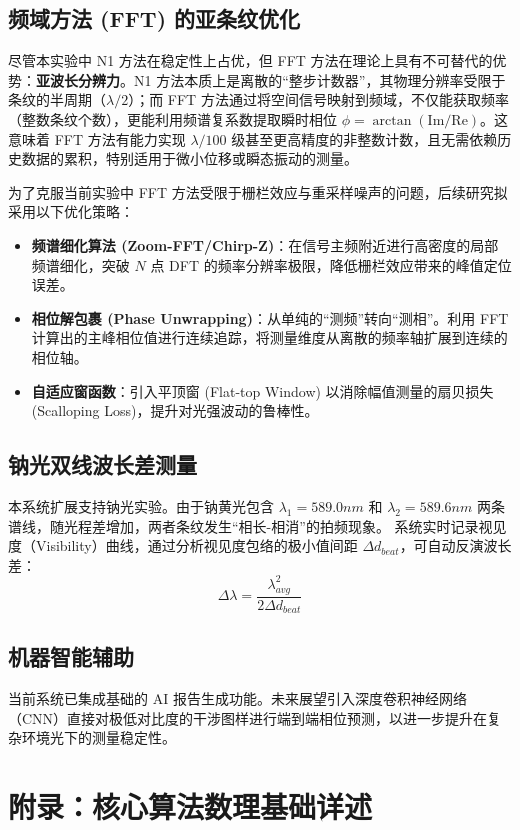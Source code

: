 \documentclass[twocolumn, a4paper, 10pt]{article}
\begin{document}
\subsection{频域方法 (FFT) 的亚条纹优化}
尽管本实验中 N1 方法在稳定性上占优，但 FFT 方法在理论上具有不可替代的优势：\textbf{亚波长分辨力}。N1 方法本质上是离散的“整步计数器”，其物理分辨率受限于条纹的半周期（$\lambda/2$）；而 FFT 方法通过将空间信号映射到频域，不仅能获取频率（整数条纹个数），更能利用频谱复系数提取瞬时相位 $\phi = \arctan(\text{Im}/\text{Re})$。这意味着 FFT 方法有能力实现 $\lambda/100$ 级甚至更高精度的非整数计数，且无需依赖历史数据的累积，特别适用于微小位移或瞬态振动的测量。

为了克服当前实验中 FFT 方法受限于栅栏效应与重采样噪声的问题，后续研究拟采用以下优化策略：
\begin{itemize}
    \item \textbf{频谱细化算法 (Zoom-FFT/Chirp-Z)}：在信号主频附近进行高密度的局部频谱细化，突破 $N$ 点 DFT 的频率分辨率极限，降低栅栏效应带来的峰值定位误差。
    \item \textbf{相位解包裹 (Phase Unwrapping)}：从单纯的“测频”转向“测相”。利用 FFT 计算出的主峰相位值进行连续追踪，将测量维度从离散的频率轴扩展到连续的相位轴。
    \item \textbf{自适应窗函数}：引入平顶窗 (Flat-top Window) 以消除幅值测量的扇贝损失 (Scalloping Loss)，提升对光强波动的鲁棒性。
\end{itemize}

\subsection{钠光双线波长差测量}
本系统扩展支持钠光实验。由于钠黄光包含 $\lambda_1 = 589.0 nm$ 和 $\lambda_2 = 589.6 nm$ 两条谱线，随光程差增加，两者条纹发生“相长-相消”的拍频现象。
系统实时记录视见度（Visibility）曲线，通过分析视见度包络的极小值间距 $\Delta d_{beat}$，可自动反演波长差：
\begin{equation}
    \Delta \lambda = \frac{\lambda_{avg}^2}{2 \Delta d_{beat}}
\end{equation}

\subsection{机器智能辅助}
当前系统已集成基础的 AI 报告生成功能。未来展望引入深度卷积神经网络（CNN）直接对极低对比度的干涉图样进行端到端相位预测，以进一步提升在复杂环境光下的测量稳定性。

\appendix
\section{附录：核心算法数理基础详述}
\end{document}

